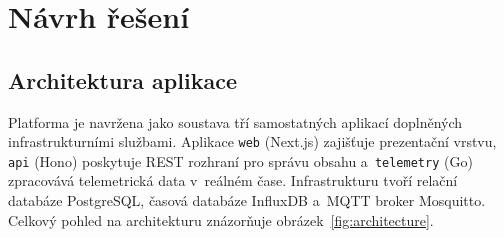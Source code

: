 \chapter{Návrh řešení}
\label{chap:navrh}

\section{Architektura aplikace}

Platforma je navržena jako soustava tří samostatných aplikací doplněných infrastrukturními službami. Aplikace \texttt{web} (Next.js) zajišťuje prezentační vrstvu, \texttt{api} (Hono) poskytuje REST rozhraní pro správu obsahu a~\texttt{telemetry} (Go) zpracovává telemetrická data v~reálném čase. Infrastrukturu tvoří relační databáze PostgreSQL, časová databáze InfluxDB a~MQTT broker Mosquitto. Celkový pohled na architekturu znázorňuje obrázek~\ref{fig:architecture}.

